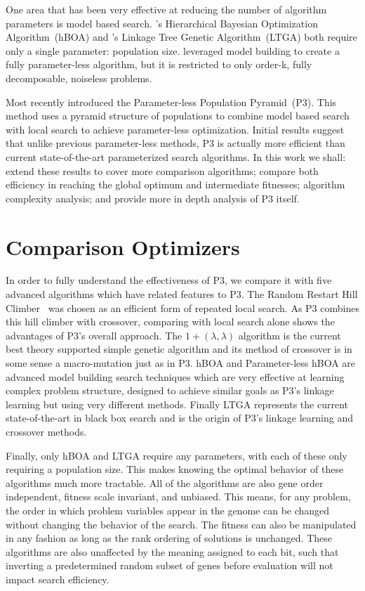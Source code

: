 \documentclass[twoside]{article}
\begin{document}
One area that has been very effective at reducing the number of algorithm parameters is
model based search. \cite{pelikan:2006:hboa}'s Hierarchical Bayesian Optimization
Algorithm~(hBOA) and \cite{thierens:2010:ltga}'s Linkage Tree Genetic Algorithm~(LTGA)
both require only a single parameter: population size. \cite{posik:2011:parameterless}
leveraged model building to create a fully parameter-less algorithm, but it is restricted to
only order-k, fully decomposable, noiseless problems.

Most recently \cite{goldman:2014:p3} introduced the Parameter-less Population Pyramid~(P3).
This method uses a pyramid structure of populations to combine model based search with local search
to achieve parameter-less optimization. Initial results suggest that unlike
previous parameter-less methods, P3 is actually more efficient than current state-of-the-art
parameterized search algorithms. In this work we shall: extend these results to cover more
comparison algorithms; compare both efficiency in reaching the global optimum and intermediate
fitnesses; algorithm complexity analysis; and provide more in depth analysis of P3 itself.

\section{Comparison Optimizers}
\label{sec-optimizers}

In order to fully understand the effectiveness of P3, we compare it with five advanced algorithms which
have related features to P3. The Random Restart Hill Climber~\citep{goldman:2014:p3} was chosen as an efficient form of repeated
local search. As P3 combines this hill climber with crossover,
comparing with local search alone shows the advantages of P3's overall approach.
The $1+(\lambda, \lambda)$ algorithm is the current best theory supported simple genetic algorithm
and its method of crossover is in some sense a macro-mutation just as in P3. hBOA and Parameter-less
hBOA are advanced model building search techniques which are very effective at learning complex
problem structure, designed to achieve similar goals as P3's linkage learning but using very different
methods. Finally LTGA represents the current state-of-the-art in black box search and is the origin
of P3's linkage learning and crossover methods.

Finally, only hBOA and LTGA require any parameters, with each of these only requiring a population
size. This makes knowing the optimal behavior of these algorithms much more tractable. All of the
algorithms are also gene order independent, fitness scale invariant, and unbiased. This means,
for any problem, the order in which problem variables appear in the genome can be changed
without changing the behavior of the search. The fitness can also be manipulated in any fashion
as long as the rank ordering of solutions is unchanged. These algorithms are also unaffected by the meaning
assigned to each bit, such that inverting a predetermined random subset of genes before evaluation
will not impact search efficiency.
\end{document}
